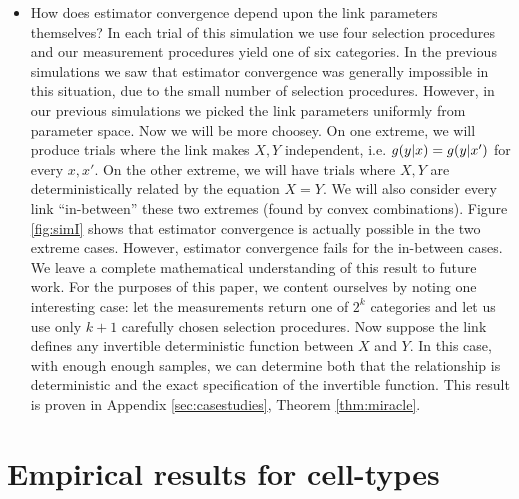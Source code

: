 \begin{itemize}
    \item How does estimator convergence depend upon the link parameters themselves?  In each trial of this simulation we use four selection procedures and our measurement procedures yield one of six categories.  In the previous simulations we saw that estimator convergence was generally impossible in this situation, due to the small number of selection procedures.  However, in our previous simulations we picked the link parameters uniformly from parameter space.  Now we will be more choosey.   On one extreme, we will produce trials where the link makes $X,Y$ independent, i.e. $g(y|x)=g(y|x')$ for every $x,x'$.  On the other extreme, we will have trials where $X,Y$ are deterministically related by the equation $X=Y$.  We will also consider every link ``in-between'' these two extremes (found by convex combinations).  Figure \ref{fig:simI} shows that estimator convergence is actually possible in the two extreme cases.  However, estimator convergence fails for the in-between cases.  We leave a complete mathematical understanding of this result to future work.  For the purposes of this paper, we content ourselves by noting one interesting case: let the measurements return one of $2^k$ categories and let us use only $k+1$ carefully chosen selection procedures.  Now suppose the link defines any invertible deterministic function between $X$ and $Y$.  In this case, with enough enough samples, we can determine both that the relationship is deterministic and the exact specification of the invertible function.  This result is proven in Appendix \ref{sec:casestudies}, Theorem \ref{thm:miracle}.
\end{itemize}

                                       

\section{Empirical results for cell-types}


